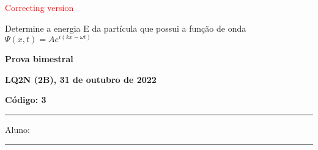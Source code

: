 \documentclass[12pt, addpoints]{exam}
\begin{document}
        \begin{center}
\textcolor{red}{\emph\Large Correcting version}\end{center}
\begin{questions}
\begin{multicols*}{2}
\question[20] Determine a energia E da partícula que possui a função de onda $\Psi(x,t)=Ae^{i(kx-\omega t)}$

\begin{oneparchoices}
\end{oneparchoices}
\end{multicols*}
\end{questions}
\newpage
        \begin{minipage}[b]{0.75\linewidth}
            \begin{flushleft}
                {\bf \large Prova bimestral}
            \end{flushleft}
            \begin{flushleft}
                {\bf \large LQ2N (2B), 31 de outubro de 2022}
            \end{flushleft}
        \end{minipage}
        \begin{minipage}[b]{0.20\linewidth}
            \begin{flushright}
                {\bf \large Código: 3}
            \end{flushright}
        \end{minipage}
        \vspace{0.5cm} \hrule \vspace{0.5cm}
        \begin{minipage}{0.75\linewidth}
            Aluno:
        \end{minipage}
        \vspace{0.5cm} \hrule \vspace{0.5cm}
\end{document}

